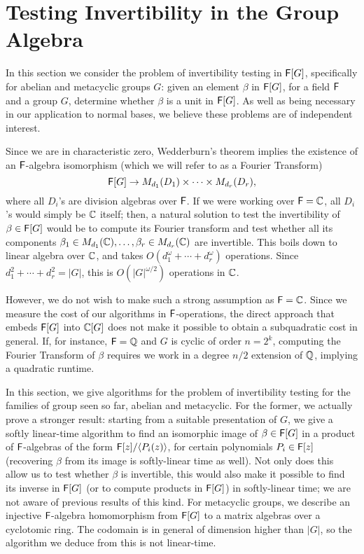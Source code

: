\section{Testing Invertibility in the Group Algebra}
\label{sec:invertibility}

In this section we consider the problem of invertibility testing in
${\mathsf{F}}[G]$, specifically for abelian and metacyclic groups $G$: given an
element $\beta$ in ${\mathsf{F}}[G]$, for a field ${\mathsf{F}}$ and a group $G$, determine
whether $\beta$ is a unit in ${\mathsf{F}}[G]$.  As well as being necessary in our
application to normal bases, we believe these problems are of independent
interest.

Since we are in characteristic zero, Wedderburn's theorem implies the
existence of an ${\mathsf{F}}$-algebra isomorphism (which we will refer to as a
Fourier Transform)
\[
  {\mathsf{F}}[G] \to M_{d_1}(D_1) \times \dots \times M_{d_r}(D_r),
\]
where all $D_i$'s are division algebras over ${\mathsf{F}}$. If we were working over
${\mathsf{F}}=\mathbb{C}$, all $D_i$'s would simply be $\mathbb{C}$ itself; then, a natural solution
to test the invertibility of $\beta \in {\mathsf{F}}[G]$ would be to compute its
Fourier transform and test whether all its components
$\beta_1 \in M_{d_1}(\mathbb{C}),\dots,\beta_r \in M_{d_r}(\mathbb{C})$ are
invertible. This boils down to linear algebra over $\mathbb{C}$, and takes
$O(d_1^\omega + \cdots + d_r^\omega)$ operations.  Since
$d_1^2 + \cdots + d_r^2 = |G|$, this is $O(|G|^{\omega/2})$ operations in
$\mathbb{C}$.

However, we do not wish to make such a strong assumption as ${\mathsf{F}}=\mathbb{C}$. Since
we measure the cost of our algorithms in ${\mathsf{F}}$-operations, the direct
approach that embeds ${\mathsf{F}}[G]$ into $\mathbb{C}[G]$ does not make it possible to
obtain a subquadratic cost in general. If, for instance, ${\mathsf{F}}=\mathbb{Q}$ and $G$ is
cyclic of order $n=2^k$, computing the Fourier Transform of $\beta$
requires we work in a degree $n/2$ extension of $\mathbb{Q}$, implying a quadratic
runtime.

In this section, we give algorithms for the problem of invertibility
testing for the families of group seen so far, abelian and metacyclic. For
the former, we actually prove a stronger result: starting from a suitable
presentation of $G$, we give a softly linear-time algorithm to find an
isomorphic image of $\beta \in {\mathsf{F}}[G]$ in a product of ${\mathsf{F}}$-algebras of the
form ${\mathsf{F}}[z]/\langle P_i(z)\rangle$, for certain polynomials $P_i \in {\mathsf{F}}[z]$
(recovering $\beta$ from its image is softly-linear time as well). Not only
does this allow us to test whether $\beta$ is invertible, this would also
make it possible to find its inverse in ${\mathsf{F}}[G]$ (or to compute products in
${\mathsf{F}}[G]$) in softly-linear time; we are not aware of previous results of
this kind. For metacyclic groups, we describe an injective ${\mathsf{F}}$-algebra
homomorphism from ${\mathsf{F}}[G]$ to a matrix algebras over a cyclotomic ring. The
codomain is in general of dimension higher than $|G|$, so the algorithm we
deduce from this is not linear-time.

